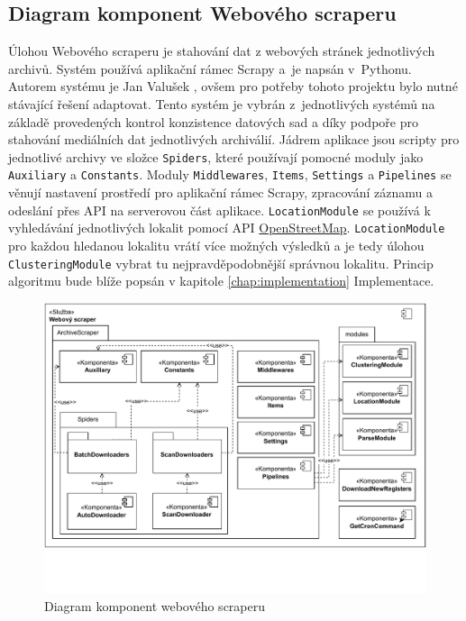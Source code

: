 \newpage
\subsection{Diagram komponent Webového scraperu} 
Úlohou Webového scraperu je stahování dat z webových stránek jednotlivých archivů. Systém používá aplikační rámec Scrapy a~je napsán v~Pythonu. Autorem systému je Jan Valušek \cite{Valusek}, ovšem pro potřeby tohoto projektu bylo nutné stávající řešení adaptovat. Tento systém je vybrán z~jednotlivých systémů na základě provedených kontrol konzistence datových sad a díky podpoře pro stahování mediálních dat jednotlivých archiválií. Jádrem aplikace jsou scripty pro jednotlivé archivy ve složce \texttt{Spiders}, které používají pomocné moduly jako \texttt{Auxiliary} a \texttt{Constants}. Moduly \texttt{Middlewares}, \texttt{Items}, \texttt{Settings} a \texttt{Pipelines} se věnují nastavení prostředí pro aplikační rámec Scrapy, zpracování záznamu a odeslání přes API na serverovou část aplikace. \texttt{LocationModule} se používá k vyhledávání jednotlivých lokalit pomocí API \href{https://www.openstreetmap.org/}{OpenStreetMap}. 
\texttt{LocationModule} pro každou hledanou lokalitu vrátí více možných výsledků a je tedy úlohou \texttt{ClusteringModule} vybrat tu nejpravděpodobnější správnou lokalitu. Princip algoritmu bude blíže popsán v kapitole \ref{chap:implementation} Implementace.

\begin{figure}[htbp]
\centering
    \includegraphics[scale=.76]{obrazky-figures/design/scraper_component_diagram.pdf}
    \caption{Diagram komponent webového scraperu}
\end{figure}

